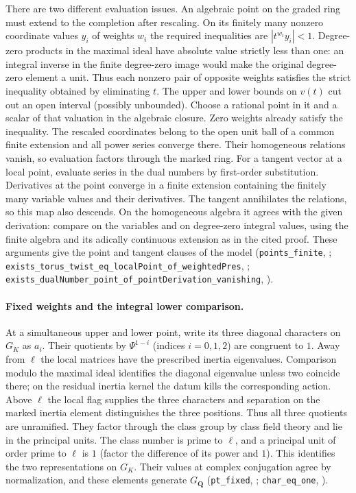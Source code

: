 There are two different evaluation issues. An algebraic point on the
graded ring must extend to the completion after rescaling. On its
finitely many nonzero coordinate values $y_i$ of weights $w_i$ the
required inequalities are $|t^{w_i}y_i|<1$. Degree-zero products in
the maximal ideal have absolute value strictly less than one: an
integral inverse in the finite degree-zero image would make the
original degree-zero element a unit. Thus each nonzero pair of
opposite weights satisfies the strict inequality obtained by eliminating
$t$. The upper and lower bounds on $v(t)$ cut out an open interval
(possibly unbounded). Choose a rational point in it and a scalar of
that valuation in the algebraic closure. Zero weights already satisfy
the inequality. The rescaled coordinates belong to the open unit ball
of a common finite extension and all power series converge there.
Their homogeneous relations vanish, so evaluation factors through
the marked ring. For a tangent vector at a local point, evaluate
series in the dual numbers by first-order substitution. Derivatives
at the point converge in a finite extension containing the finitely
many variable values and their derivatives. The tangent annihilates
the relations, so this map also descends. On the homogeneous algebra
it agrees with the given derivation: compare on the variables and on
degree-zero integral values, using the finite algebra and its
adically continuous extension as in the cited proof. These arguments
give the point and tangent clauses of the model
(\nolinkurl{points_finite}, ;
\nolinkurl{exists_torus_twist_eq_localPoint_of_weightedPres},
;
\nolinkurl{exists_dualNumber_point_of_pointDerivation_vanishing},
).

\paragraph{Fixed weights and the integral lower comparison.}
At a simultaneous upper and lower point, write its three diagonal
characters on $G_K$ as $a_i$. Their quotients by
$\Psi^{1-i}$ (indices $i=0,1,2$) are congruent to $1$.
Away from $\ell$ the local matrices have the prescribed inertia
eigenvalues. Comparison modulo the maximal ideal identifies the
diagonal eigenvalue unless two coincide there; on the residual
inertia kernel the datum kills the corresponding action. Above
$\ell$ the local flag supplies the three characters and separation
on the marked inertia element distinguishes the three positions.
Thus all three quotients are unramified. They factor through the
class group by class field theory and lie in the principal units.
The class number is prime to $\ell$, and a principal unit of order
prime to $\ell$ is $1$ (factor the difference of its power and $1$).
This identifies the two representations on $G_K$. Their values at
complex conjugation agree by normalization, and these elements
generate $G_{\mathbf Q}$
(\nolinkurl{pt_fixed}, ;
\nolinkurl{char_eq_one}, ).


